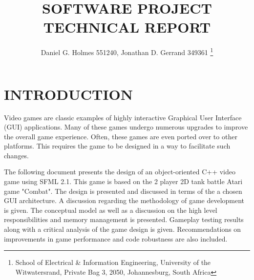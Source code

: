 \documentclass[10pt,twocolumn]{witseiepaper}
\begin{document}
\title{SOFTWARE PROJECT TECHNICAL REPORT}

\author{Daniel G. Holmes 551240, Jonathan D. Gerrand 349361
\thanks{School of Electrical \& Information Engineering, University of the
Witwatersrand, Private Bag 3, 2050, Johannesburg, South Africa}
}

% 



\maketitle
\thispagestyle{empty}\pagestyle{empty}


%
\section{INTRODUCTION}%
Video games are classic examples of highly interactive Graphical User Interface (GUI) applications. Many of these games undergo numerous upgrades to improve the overall game experience. Often, these games are even ported over to other platforms. This requires the game to be designed in a way to facilitate such changes. 

The following document presents the design of an object-oriented C++ video game using SFML 2.1. This game is based on the 2 player 2D tank battle Atari game "Combat". The design is presented and discussed in terms of the a chosen GUI architecture. A discussion regarding the methodology of game development is given. The conceptual model as well as a discussion on the high level responsibilities and memory management is presented. Gameplay testing results along with a critical analysis of the game design is given. Recommendations on improvements in game performance and code robustness are also included.
\end{document}
